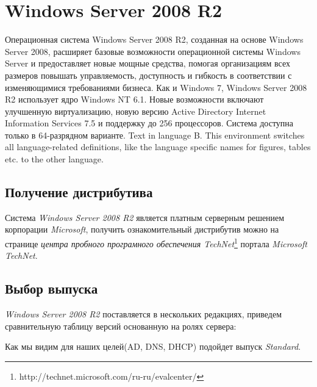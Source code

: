\part{Windows Server 2008 R2}
\thispagestyle{plain}
Операционная система \foreignlanguage{english}{Windows Server 2008 R2}, созданная на основе \foreignlanguage{english}{Windows Server 2008}, расширяет базовые возможности операционной системы \foreignlanguage{english}{Windows Server} и предоставляет новые мощные средства, помогая организациям всех размеров повышать управляемость, доступность и гибкость в соответствии с изменяющимися требованиями бизнеса.
Как и Windows 7, Windows Server 2008 R2 использует ядро Windows NT 6.1.
Новые возможности включают улучшенную виртуализацию, новую версию \foreignlanguage{english}{Active Directory Internet Information Services 7.5} и поддержку до 256 процессоров. Система доступна только в 64-разрядном варианте.
\foreignlanguage{english}{Text in language B. This environment switches all language-related definitions, like the language specific names for figures, tables etc. to the other language.}

\chapter{Получение дистрибутива}
Система \textit{Windows Server 2008 R2} является платным серверным решением корпорации \textit{Microsoft}, получить ознакомительный дистрибутив можно на странице \textit{центра пробного програмного обеспечения TechNet}\footnote{http://technet.microsoft.com/ru-ru/evalcenter/} портала \textit{Microsoft TechNet}.

\chapter{Выбор выпуска}
\textit{Windows Server 2008 R2} поставляется в нескольких редакциях, приведем сравнительную таблицу версий основанную на ролях сервера:
\begin{figure}[H]
\end{figure}
Как мы видим для наших целей(AD, DNS, DHCP) подойдет выпуск \textit{Standard}.
\newpage
